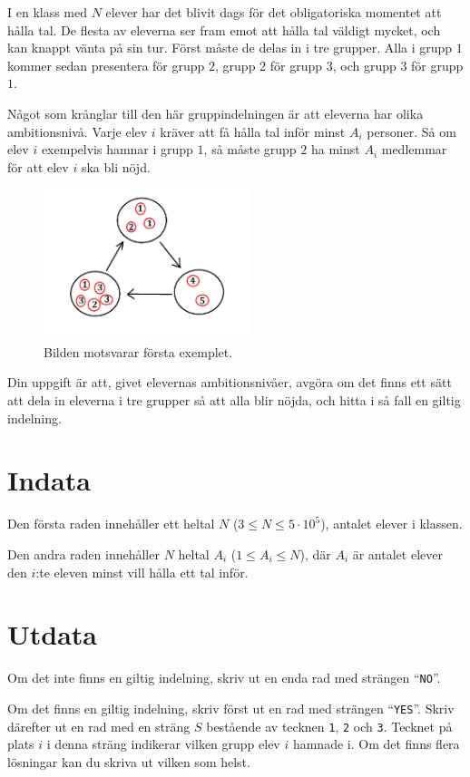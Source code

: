 I en klass med $N$ elever har det blivit dags för det obligatoriska momentet att hålla tal. 
De flesta av eleverna ser fram emot att hålla tal väldigt mycket, och kan knappt vänta på sin tur.
Först måste de delas in i tre grupper. Alla i grupp $1$ kommer sedan presentera för grupp $2$, 
grupp $2$ för grupp $3$, och grupp $3$ för grupp $1$. 

Något som krånglar till den här gruppindelningen är att eleverna har olika ambitionsnivå. Varje elev $i$
kräver att få hålla tal inför minst $A_i$ personer.
Så om elev $i$ exempelvis hamnar i grupp $1$, så måste grupp $2$ ha minst $A_i$ medlemmar för att elev $i$ ska bli nöjd.

\begin{figure}[!h]
  \centering
  \includegraphics[width=6cm]{triangeltal.png}
  \caption{Bilden motsvarar första exemplet.}
\end{figure}

Din uppgift är att, givet elevernas ambitionsnivåer, avgöra om det finns ett sätt att dela in eleverna i tre grupper så att alla blir nöjda, och hitta i så fall en giltig indelning.

\section*{Indata}
Den första raden innehåller ett heltal $N$ ($3 \leq N \leq 5 \cdot 10^5$), antalet elever i klassen.

Den andra raden innehåller $N$ heltal $A_i$ ($1 \leq A_i \leq N$), där $A_i$ är antalet elever den $i$:te eleven minst vill hålla ett tal inför.

\section*{Utdata}
Om det inte finns en giltig indelning, skriv ut en enda rad med strängen ``\texttt{NO}''.

Om det finns en giltig indelning, skriv först ut en rad med strängen ``\texttt{YES}''. 
Skriv därefter ut en rad med en sträng $S$ bestående av tecknen \texttt{1}, \texttt{2} och \texttt{3}.
Tecknet på plats $i$ i denna sträng indikerar vilken grupp elev $i$ hamnade i. Om det finns flera lösningar
kan du skriva ut vilken som helst.

